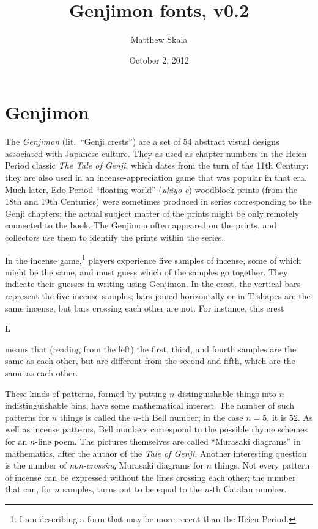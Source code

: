 \documentclass[12pt]{article}
\title{Genjimon fonts, v0.2}
\author{Matthew Skala}
\date{October 2, 2012}
\newcommand\genji[1]{{\genjiface #1}}
\begin{document}

\maketitle

\section{Genjimon}

The \textit{Genjimon} (lit.~``Genji crests'') are a set of 54 abstract
visual designs associated with Japanese culture.  They as used as chapter
numbers in the Heien Period classic \textit{The Tale of Genji}, which dates
from the turn of the 11th Century; they are also used in an
incense-appreciation game that was popular in that era.  Much later, Edo
Period ``floating world'' (\textit{ukiyo-e}) woodblock prints (from the 18th
and 19th Centuries) were sometimes produced in series corresponding to the
Genji chapters; the actual subject matter of the prints might be only
remotely connected to the book.  The Genjimon often appeared on the prints,
and collectors use them to identify the prints within the series.

In the incense game,\footnote{I am describing a form that may be more recent
than the Heien Period.} players experience five samples of incense, some
of which might be the same, and must guess which of the samples go together.
They indicate their guesses in writing using
Genjimon.  In the crest, the vertical bars represent the five incense
samples; bars joined horizontally or in \textsf{T}-shapes are the same
incense, but bars crossing each other are not.  For instance, this crest
\begin{center}
  \Huge\genji{L}
\end{center}
means that (reading from the left) the first, third, and fourth samples are
the same as each other, but are different from the second and fifth, which are
the same as each other.

These kinds of patterns, formed by putting $n$ distinguishable things into
$n$ indistinguishable bins, have some mathematical interest.  The number of
such patterns for $n$ things is called the $n$-th Bell number; in the case
$n=5$, it is $52$. As well as incense patterns, Bell numbers correspond to
the possible rhyme schemes for an $n$-line poem.  The pictures themselves
are called ``Murasaki diagrams'' in mathematics, after the author of the
\textit{Tale of Genji}.  Another interesting question is the number of
\emph{non-crossing} Murasaki diagrams for $n$ things.  Not every pattern of
incense can be expressed without the lines crossing each other; the number
that can, for $n$ samples, turns out to be equal to the $n$-th Catalan
number.
\end{document}
